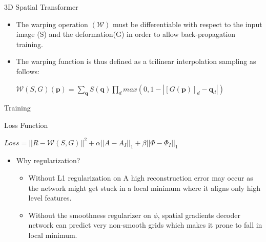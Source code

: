 \documentclass{beamer}
\begin{document}
\begin{frame}{3D Spatial Transformer}
    \begin{itemize}
        \item The warping operation $(\mathcal{W})$ must be differentiable with respect to the input image (S) and the deformation(G) in order to allow back-propagation training.
        \pause
        \item The warping function is thus defined as a trilinear interpolation sampling as follows:
        \begin{block}{}
            \centering
            $\mathcal{W}(S,G)(\textbf{p}) = \underset{\textbf{q}}{\sum}S(\textbf{q})\underset{d}{\prod}max(0,1-|[G(\textbf{p})]_d-\textbf{q}_d|)$
        \end{block}
    \end{itemize}
\end{frame}

\begin{frame}{Training}
    
        \begin{block}{Loss Function}
        \begin{center}
        $Loss = || R - \mathcal{W}(S,G) ||^2 + \alpha||A-A_I||_1 + \beta||\Phi-\Phi_I||_1$
        \end{center}
    \end{block}
    \pause
    \begin{itemize}
        \item Why regularization?
        \begin{itemize}
            \pause
            \item Without L1 regularization on A high reconstruction error may occur as the network might get stuck in a local minimum where it aligns only high level features.
            \pause
            \item Without the smoothness regularizer on $\phi$, spatial gradients decoder network can predict very non-smooth grids which makes it prone to fall in local minimum.
        \end{itemize}
    \end{itemize}
    
    
\end{frame}
\end{document}
